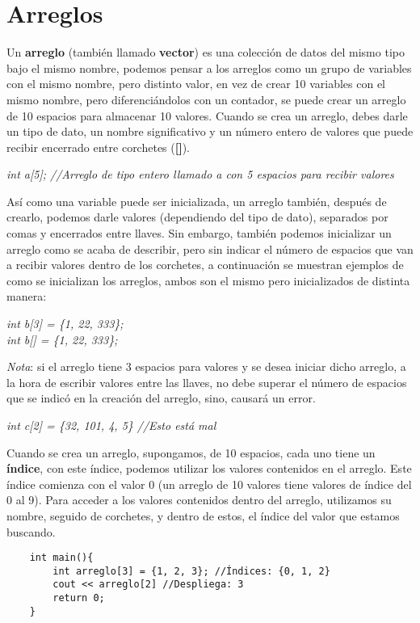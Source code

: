 \section{Arreglos}
Un \textbf{arreglo} (también llamado \textbf{vector}) es una colección de datos del mismo tipo bajo el mismo nombre, podemos pensar a los arreglos como un grupo de variables con el mismo nombre, pero distinto valor, en vez de crear 10 variables con el mismo nombre, pero diferenciándolos con un contador, se puede crear un arreglo de 10 espacios para almacenar 10 valores. Cuando se crea un arreglo, debes darle un tipo de dato, un nombre significativo y un número entero de valores que puede recibir encerrado entre corchetes (\textbf{[]}).\begin{center}\textit{int a[5]; //Arreglo de tipo entero llamado a con 5 espacios para recibir valores}\end{center}
Así como una variable puede ser inicializada, un arreglo también, después de crearlo, podemos darle valores (dependiendo del tipo de dato), separados por comas y encerrados entre llaves. Sin embargo, también podemos inicializar un arreglo como se acaba de describir, pero sin indicar el número de espacios que van a recibir valores dentro de los corchetes, a continuación se muestran ejemplos de como se inicializan los arreglos, ambos son el mismo pero inicializados de distinta manera:
\begin{center}
    \textit{int b[3] = \{1, 22, 333\};\\
            int b[] = \{1, 22, 333\};}
\end{center}
\textit{Nota}: si el arreglo tiene 3 espacios para valores y se desea iniciar dicho arreglo, a la hora de escribir valores entre las llaves, no debe superar el número de espacios que se indicó en la creación del arreglo, sino, causará un error.\begin{center}\textit{int c[2] = \{32, 101, 4, 5\} //Esto está mal}\end{center}
Cuando se crea un arreglo, supongamos, de 10 espacios, cada uno tiene un \textbf{índice}, con este índice, podemos utilizar los valores contenidos en el arreglo. Este índice comienza con el valor 0 (un arreglo de 10 valores tiene valores de índice del 0 al 9). Para acceder a los valores contenidos dentro del arreglo, utilizamos su nombre, seguido de corchetes, y dentro de estos, el índice del valor que estamos buscando.
\begin{lstlisting}
    int main(){
        int arreglo[3] = {1, 2, 3}; //Índices: {0, 1, 2}
        cout << arreglo[2] //Despliega: 3
        return 0;
    }
\end{lstlisting}

